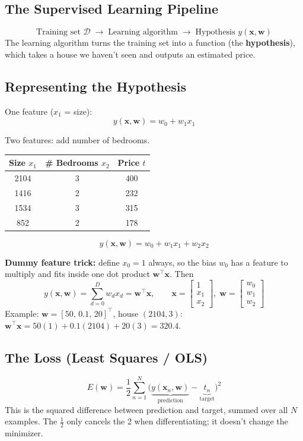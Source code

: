 \subsection*{The Supervised Learning Pipeline}
\[
\text{Training set } \mathcal{D} \;\longrightarrow\; \text{Learning algorithm} \;\longrightarrow\; \text{Hypothesis } y(\mathbf{x}, \mathbf{w})
\]
The learning algorithm turns the training set into a function (the \textbf{hypothesis}), which takes a house we haven't seen and outputs an estimated price.

\subsection*{Representing the Hypothesis}
One feature ($x_1$ = size):
\[
y(\mathbf{x}, \mathbf{w}) = w_0 + w_1 x_1
\]

Two features: add number of bedrooms.

\begin{center}
\begin{tabular}{ccc}
\toprule
Size $x_1$ & \# Bedrooms $x_2$ & Price $t$ \\
\midrule
2104 & 3 & 400 \\
1416 & 2 & 232 \\
1534 & 3 & 315 \\
852  & 2 & 178 \\
\bottomrule
\end{tabular}
\end{center}

\[
y(\mathbf{x}, \mathbf{w}) = w_0 + w_1 x_1 + w_2 x_2
\]

\textbf{Dummy feature trick:} define $x_0 = 1$ always, so the bias $w_0$ has a feature to multiply and fits inside one dot product $\mathbf{w}^\top\mathbf{x}$. Then
\[
y(\mathbf{x}, \mathbf{w}) = \sum_{d=0}^{D} w_d x_d = \mathbf{w}^\top \mathbf{x},
\qquad
\mathbf{x} = \begin{bmatrix} 1 \\ x_1 \\ x_2 \end{bmatrix},\;
\mathbf{w} = \begin{bmatrix} w_0 \\ w_1 \\ w_2 \end{bmatrix}
\]
Example: $\mathbf{w} = [50,\, 0.1,\, 20]^\top$, house $(2104, 3)$:
$\mathbf{w}^\top\mathbf{x} = 50(1) + 0.1(2104) + 20(3) = 320.4$.

\subsection*{The Loss (Least Squares / OLS)}
\[
E(\mathbf{w}) = \frac{1}{2}\sum_{n=1}^{N} \Big( \underbrace{y(\mathbf{x}_n, \mathbf{w})}_{\text{prediction}} - \underbrace{t_n}_{\text{target}} \Big)^2
\]
This is the squared difference between prediction and target, summed over all $N$ examples. The $\tfrac12$ only cancels the 2 when differentiating; it doesn't change the minimizer.

